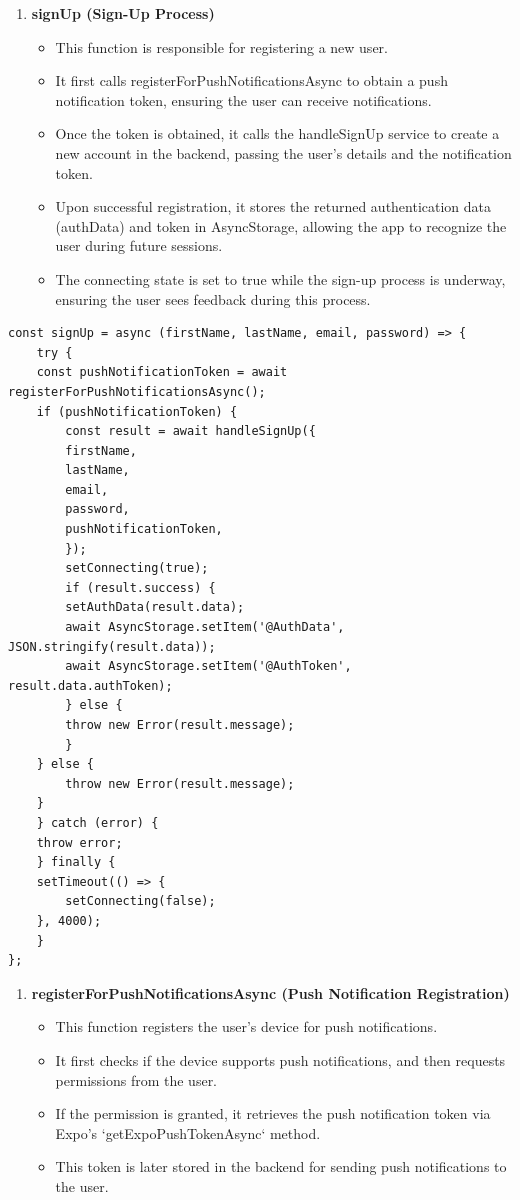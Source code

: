 \begin{enumerate}
    \item \textbf{signUp (Sign-Up Process)}
    \begin{itemize}
        \item This function is responsible for registering a new user. \item It first calls registerForPushNotificationsAsync to obtain a push notification token, ensuring the user can receive notifications.
        \item Once the token is obtained, it calls the handleSignUp service to create a new account in the backend, passing the user’s details and the notification token.
        \item Upon successful registration, it stores the returned authentication data (authData) and token in AsyncStorage, allowing the app to recognize the user during future sessions.
        \item The connecting state is set to true while the sign-up process is underway, ensuring the user sees feedback during this process.
    \end{itemize}
\end{enumerate}

\begin{lstlisting}[caption={Sign Up Function}]
const signUp = async (firstName, lastName, email, password) => {
    try {
    const pushNotificationToken = await registerForPushNotificationsAsync();
    if (pushNotificationToken) {
        const result = await handleSignUp({
        firstName,
        lastName,
        email,
        password,
        pushNotificationToken,
        });
        setConnecting(true);
        if (result.success) {
        setAuthData(result.data);
        await AsyncStorage.setItem('@AuthData', JSON.stringify(result.data));
        await AsyncStorage.setItem('@AuthToken', result.data.authToken);
        } else {
        throw new Error(result.message);
        }
    } else {
        throw new Error(result.message);
    }
    } catch (error) {
    throw error;
    } finally {
    setTimeout(() => {
        setConnecting(false);
    }, 4000);
    }
};
\end{lstlisting}

\begin{enumerate}[resume]
    \item \textbf{registerForPushNotificationsAsync (Push Notification Registration)}
    \begin{itemize}
        \item This function registers the user’s device for push notifications.
        \item It first checks if the device supports push notifications, and then requests permissions from the user.
        \item If the permission is granted, it retrieves the push notification token via Expo's `getExpoPushTokenAsync` method.
        \item This token is later stored in the backend for sending push notifications to the user.
    \end{itemize}
\end{enumerate}

